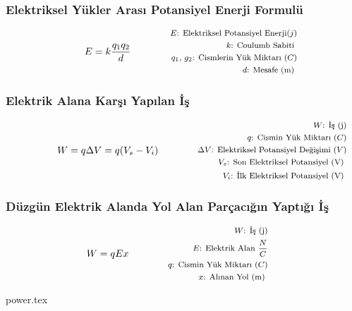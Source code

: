 \subsubsection*{Elektriksel Yükler Arası Potansiyel Enerji Formulü}
\begin{equation}
    E = k \frac{q_1 q_2}{d} \qquad \qquad \parbox{4cm}{\footnotesize$\begin{aligned}
        E\text{: Elektriksel Potansiyel Enerji} (j) \\
        k\text{: Coulumb Sabiti } \\
        q_1\text{, }g_2\text{: Cismlerin Yük Miktarı } (C) \\
        d\text{: Mesafe (m) }
\end{aligned}$}
\end{equation}

\subsubsection*{Elektrik Alana Karşı Yapılan İş}
\begin{equation}
    W = q \Delta V = q (V_s - V_i) \qquad \qquad \parbox{4cm}{\footnotesize$\begin{aligned}
        W\text{: İş (j)} \\
        q\text{: Cismin Yük Miktarı } (C) \\
        \Delta V\text{: Elektriksel Potansiyel Değişimi } (V) \\
        V_s\text{: Son Elektriksel Potansiyel (V) } \\
        V_i\text{: İlk Elektriksel Potansiyel (V) }
\end{aligned}$}
\end{equation}

\subsubsection*{Düzgün Elektrik Alanda Yol Alan Parçacığın Yaptığı İş}
\begin{equation}
    W = qEx\qquad \qquad \parbox{4cm}{\footnotesize$\begin{aligned}
        W\text{: İş (j)} \\
        E\text{: Elektrik Alan } \frac{N}{C} \\
        q\text{: Cismin Yük Miktarı } (C) \\
        x\text{: Alınan Yol (m) }
\end{aligned}$}
\end{equation}

{power.tex}
